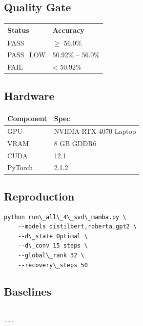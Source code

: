 \subsection{Quality Gate}

\begin{table}[H]
\centering
\small
\begin{tabular}{ll}
\toprule
\textbf{Status} & \textbf{Accuracy} \\
\midrule
PASS & $\ge$ 56.0\% \\
PASS\_LOW & 50.92\% -- 56.0\% \\
FAIL & \textless{} 50.92\% \\
\bottomrule
\end{tabular}
\end{table}

\subsection{Hardware}

\begin{table}[H]
\centering
\small
\begin{tabular}{ll}
\toprule
\textbf{Component} & \textbf{Spec} \\
\midrule
GPU & NVIDIA RTX 4070 Laptop \\
VRAM & 8 GB GDDR6 \\
CUDA & 12.1 \\
PyTorch & 2.1.2 \\
\bottomrule
\end{tabular}
\end{table}

\subsection{Reproduction}

\begin{lstlisting}
python run\_all\_4\_svd\_mamba.py \
    --models distilbert,roberta,gpt2 \
    --d\_state Optimal \
    --d\_conv 15 steps \
    --global\_rank 32 \
    --recovery\_steps 50
\end{lstlisting}

\subsection{Baselines}

\begin{lstlisting}

---
\end{lstlisting}

